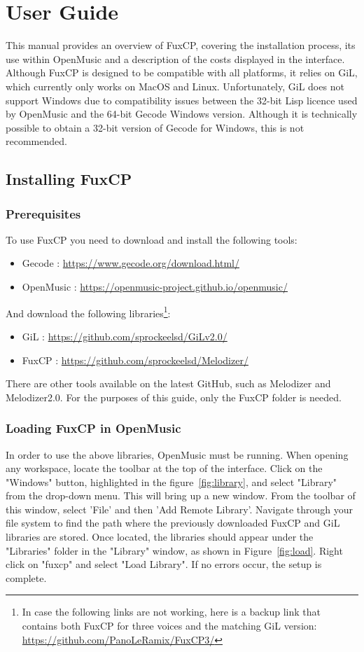 \chapter{User Guide}\label{chapter:user-guide}
This manual provides an overview of FuxCP, covering the installation process, its use within OpenMusic and a description of the costs displayed in the interface. Although FuxCP is designed to be compatible with all platforms, it relies on GiL, which currently only works on MacOS and Linux. Unfortunately, GiL does not support Windows due to compatibility issues between the 32-bit Lisp licence used by OpenMusic and the 64-bit Gecode Windows version. Although it is technically possible to obtain a 32-bit version of Gecode for Windows, this is not recommended.

\section{Installing FuxCP}
\subsection{Prerequisites}
To use FuxCP you need to download and install the following tools:
\begin{itemize}
    \item Gecode : \url{https://www.gecode.org/download.html/}
    \item OpenMusic : \url{https://openmusic-project.github.io/openmusic/}
\end{itemize}


And download the following libraries\footnote{In case the following links are not working, here is a backup link that contains both FuxCP for three voices and the matching GiL version: \url{https://github.com/PanoLeRamix/FuxCP3/}}:
\begin{itemize}
    \item GiL : \url{https://github.com/sprockeelsd/GiLv2.0/}
    \item FuxCP : \url{https://github.com/sprockeelsd/Melodizer/}
\end{itemize}
There are other tools available on the latest GitHub, such as Melodizer and Melodizer2.0. For the purposes of this guide, only the FuxCP folder is needed.

\subsection{Loading FuxCP in OpenMusic}
In order to use the above libraries, OpenMusic must be running. When opening any workspace, locate the toolbar at the top of the interface. Click on the "Windows" button, highlighted in the figure~\ref{fig:library}, and select "Library" from the drop-down menu. This will bring up a new window. From the toolbar of this window, select 'File' and then 'Add Remote Library'. Navigate through your file system to find the path where the previously downloaded FuxCP and GiL libraries are stored. Once located, the libraries should appear under the "Libraries" folder in the "Library" window, as shown in Figure~\ref{fig:load}. Right click on "fuxcp" and select "Load Library". If no errors occur, the setup is complete.

